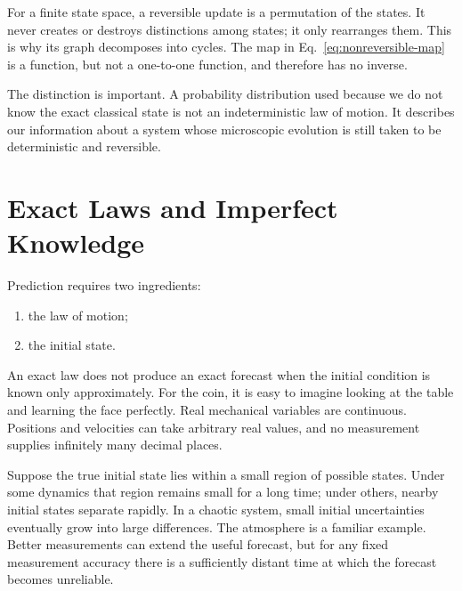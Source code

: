 For a finite state space, a reversible update is a permutation of the states.
It never creates or destroys distinctions among states; it only rearranges
them.  This is why its graph decomposes into cycles.  The map in
Eq.~\eqref{eq:nonreversible-map} is a function, but not a one-to-one function,
and therefore has no inverse.

\begin{classroomqa}

\end{classroomqa}

The distinction is important.  A probability distribution used because we
do not know the exact classical state is not an indeterministic law of motion.
It describes our information about a system whose microscopic evolution is
still taken to be deterministic and reversible.

\section{Exact Laws and Imperfect Knowledge}

Prediction requires two ingredients:
\begin{enumerate}
  \item the law of motion;
  \item the initial state.
\end{enumerate}
An exact law does not produce an exact forecast when the initial condition is
known only approximately.  For the coin, it is easy to imagine looking at the
table and learning the face perfectly.  Real mechanical variables are
continuous.  Positions and velocities can take arbitrary real values, and no
measurement supplies infinitely many decimal places.

Suppose the true initial state lies within a small region of possible states.
Under some dynamics that region remains small for a long time; under others,
nearby initial states separate rapidly.  In a chaotic system, small initial
uncertainties eventually grow into large differences.  The atmosphere is a
familiar example.  Better measurements can extend the useful forecast, but
for any fixed measurement accuracy there is a sufficiently distant time at
which the forecast becomes unreliable.

